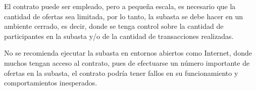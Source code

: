   
      El contrato puede ser empleado, pero a pequeña escala, es necesario que la cantidad de ofertas sea 
      limitada, por lo tanto, la subasta se debe hacer en un ambiente cerrado, es decir, donde se tenga
      control sobre la cantidad de participantes en la subasta y/o de la cantidad de transacciones realizadas.
      
      No se recomienda ejecutar la subasta en entornos abiertos como Internet, donde muchos tengan acceso al
      contrato, pues de efectuarse un número importante de ofertas en la subasta, el contrato podría tener
      fallos en su funcionamiento y comportamientos inesperados.